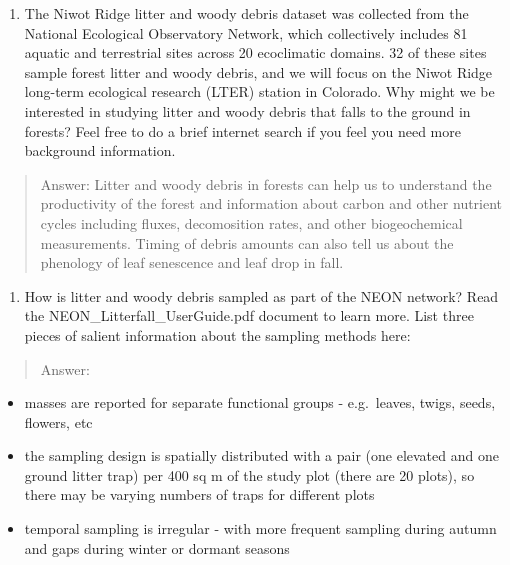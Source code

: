 \documentclass[
]{article}
\providecommand{\tightlist}{%
  \setlength{\itemsep}{0pt}\setlength{\parskip}{0pt}}
\begin{document}
\begin{enumerate}
\def\labelenumi{\arabic{enumi}.}
\setcounter{enumi}{2}
\tightlist
\item
  The Niwot Ridge litter and woody debris dataset was collected from the
  National Ecological Observatory Network, which collectively includes
  81 aquatic and terrestrial sites across 20 ecoclimatic domains. 32 of
  these sites sample forest litter and woody debris, and we will focus
  on the Niwot Ridge long-term ecological research (LTER) station in
  Colorado. Why might we be interested in studying litter and woody
  debris that falls to the ground in forests? Feel free to do a brief
  internet search if you feel you need more background information.
\end{enumerate}

\begin{quote}
Answer: Litter and woody debris in forests can help us to understand the
productivity of the forest and information about carbon and other
nutrient cycles including fluxes, decomosition rates, and other
biogeochemical measurements. Timing of debris amounts can also tell us
about the phenology of leaf senescence and leaf drop in fall.
\end{quote}

\begin{enumerate}
\def\labelenumi{\arabic{enumi}.}
\setcounter{enumi}{3}
\tightlist
\item
  How is litter and woody debris sampled as part of the NEON network?
  Read the NEON\_Litterfall\_UserGuide.pdf document to learn more. List
  three pieces of salient information about the sampling methods here:
\end{enumerate}

\begin{quote}
Answer:
\end{quote}

\begin{itemize}
\tightlist
\item
  masses are reported for separate functional groups - e.g.~leaves,
  twigs, seeds, flowers, etc
\item
  the sampling design is spatially distributed with a pair (one elevated
  and one ground litter trap) per 400 sq m of the study plot (there are
  20 plots), so there may be varying numbers of traps for different
  plots
\item
  temporal sampling is irregular - with more frequent sampling during
  autumn and gaps during winter or dormant seasons
\end{itemize}
\end{document}
